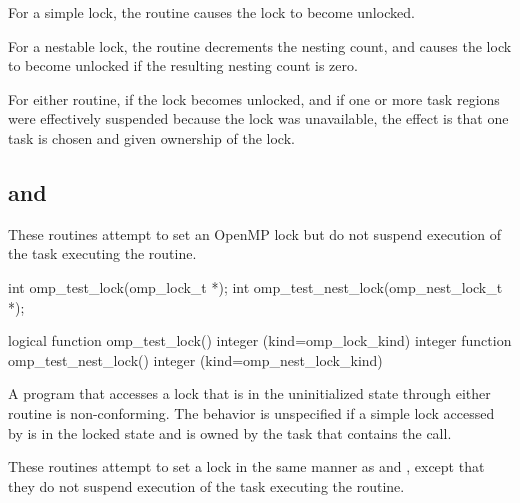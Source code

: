 
\effect
For a simple lock, the  routine causes the lock to become unlocked.

For a nestable lock, the  routine decrements the nesting 
count, and causes the lock to become unlocked if the resulting nesting count is zero.

For either routine, if the lock becomes unlocked, and if one or more task 
regions were effectively suspended because the lock was unavailable, the 
effect is that one task is chosen and given ownership of the lock. 









\subsection{ and }
\label{subsec:omp_test_lock and omp_test_nest_lock}
\summary
These routines attempt to set an OpenMP lock but do not suspend execution of the task 
executing the routine.

\format
\ccppspecificstart
\begin{boxedcode}
int omp\_test\_lock(omp\_lock\_t *);
int omp\_test\_nest\_lock(omp\_nest\_lock\_t *);
\end{boxedcode}
\ccppspecificend

\fortranspecificstart
\begin{boxedcode}
logical function omp\_test\_lock()
integer (kind=omp\_lock\_kind) 
integer function omp\_test\_nest\_lock()
integer (kind=omp\_nest\_lock\_kind) 
\end{boxedcode}
\fortranspecificend

\constraints
A program that accesses a lock that is in the uninitialized state through either routine is 
non-conforming. The behavior is unspecified if a simple lock accessed by 
 is in the locked state and is owned by the task that contains the call.

\effect 
These routines attempt to set a lock in the same manner as  and 
, except that they do not suspend execution of the task 
executing the routine.

